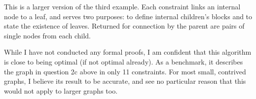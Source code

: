 \documentclass[11pt]{article} %
\begin{document}
This is a larger version of the third example. Each constraint links an internal node to a leaf, and serves two purposes: to define internal children's blocks and to state the existence of leaves. Returned for connection by the parent are pairs of single nodes from each child.

\hfill

While I have not conducted any formal proofs, I am confident that this algorithm is close to being optimal (if not optimal already). As a benchmark, it describes the graph in question 2c above in only 11 constraints. For most small, contrived graphs, I believe its result to be accurate, and see no particular reason that this would not apply to larger graphs too.
\end{document}
